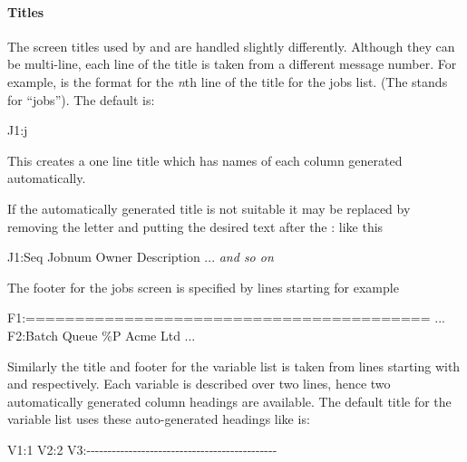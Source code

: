 \paragraph{Titles}
The screen titles used by \PrBtq{} and \PrBtuser{} are handled slightly differently.
Although they can be multi-line, each line of the title is taken from a different message number. For example,
\exampletext{:}
is the format for the \textit{n}th line of the title for the \PrBtq{} jobs list. (The 
stands for ``jobs''). The default is:

\begin{expara}

J1:j

\end{expara}

This creates a one line title which has names of each column generated
automatically.

If the automatically generated title is not suitable it may be replaced by removing the letter  and putting the desired
text after the : like this

\begin{expara}

J1:Seq Jobnum Owner Description ... \textit{and so on}

\end{expara}

The footer for the jobs screen is specified by lines starting  for example

\begin{expara}

F1:========================================= ...\newline
F2:Batch Queue \%P Acme Ltd ...

\end{expara}

Similarly the title and footer for the \PrBtq{} variable list is taken from lines starting with
 and  respectively. Each variable is described over two lines, hence two automatically
generated column headings are available. The default title for the variable list uses these auto-generated headings like is:

\begin{expara}

V1:1\newline
V2:2\newline
V3:-{}-{}-{}-{}-{}-{}-{}-{}-{}-{}-{}-{}-{}-{}-{}-{}-{}-{}-{}-{}-{}-{}-{}-{}-{}-{}-{}-{}-{}-{}-{}-{}-{}-{}-{}-{}-{}-{}-{}-{}-{}-{}-{}-{}-

\end{expara}

